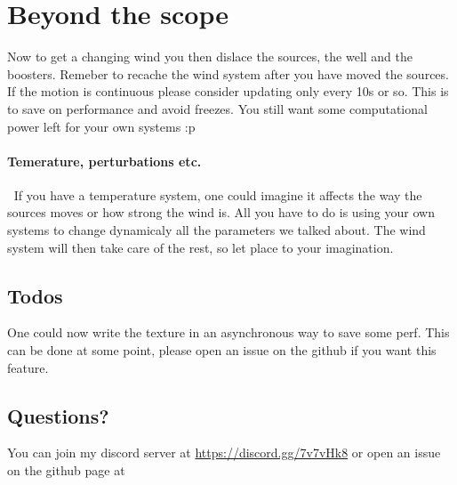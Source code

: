 \documentclass[../main.tex]{subfile}
\begin{document}
\section{Beyond the scope}
    Now to get a changing wind you then dislace the sources, the well and the boosters. Remeber to recache the wind system after you have moved the sources. If the motion is
    continuous please consider updating only every 10s or so. This is to save on performance and avoid freezes. You still want some computational power left 
    for your own systems :p\\

    \paragraph{Temerature, perturbations etc.} $~$ If you have a temperature system, one could imagine it affects the way the sources moves or how strong the wind is. All
    you have to do is using your own systems to change dynamicaly all the parameters we talked about. The wind system will then take care of the rest,
     so let place to your imagination.\\

     \subsection{Todos} 
     One could now write the texture in an asynchronous way to save some perf. This can be done at some point, please open an issue on the github if you want this feature.\\

     \subsection{Questions?}
     You can join my discord server at \url{https://discord.gg/7v7vHk8} or open an issue on the github page at %
\end{document}
